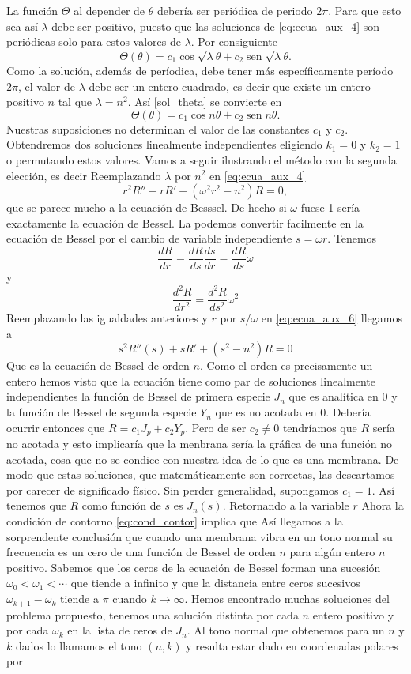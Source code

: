 \documentclass{article}
\newcounter{cor_cont}
\newcounter{lem_cont}
\DeclareMathOperator{\sen}{sen}
\begin{document}
La función $\Theta$ al depender de $\theta$ debería ser periódica de periodo $2\pi$. Para que esto sea así  $\lambda$ debe ser positivo, puesto que las soluciones de  \ref{eq:ecua_aux_4} son periódicas solo para estos valores de $\lambda$. Por consiguiente
\begin{equation}\label{sol_theta}
\Theta(\theta)=c_1\cos\sqrt{\lambda}\theta+c_2\sen\sqrt{\lambda}\theta.
\end{equation}
 Como la solución, además de períodica,  debe tener más específicamente  período $2\pi$, el valor de $\lambda$ debe ser un entero cuadrado, es decir que existe un entero positivo  $n$ tal que $\lambda=n^2$.   Así \eqref{sol_theta} se convierte en 
\[\Theta(\theta)= c_1\cos n\theta+c_2\sen n\theta.\]
Nuestras suposiciones no  determinan el valor de las constantes $c_1$ y $c_2$. Obtendremos dos soluciones linealmente independientes eligiendo $k_1=0$ y $k_2=1$ o permutando estos valores. Vamos a seguir ilustrando el método con la segunda elección, es decir
 Reemplazando $\lambda$ por $n^2$ en \eqref{eq:ecua_aux_4} 
\[r^2R'' +rR'+(\omega^2r^2-n^2) R=0\label{eq:ecua_aux_6},\]
que se parece mucho a la ecuación de Besssel. De hecho si $\omega$ fuese 1 sería exactamente la ecuación de Bessel. La podemos convertir facilmente en la ecuación de Bessel por el cambio de variable independiente $s=\omega r$. Tenemos 
\[\frac{dR}{dr}=\frac{dR}{ds}\frac{ds}{dr}=\frac{dR}{ds}\omega\]
y
\[\frac{d^2R}{dr^2}=\frac{d^2R}{ds^2}\omega^2\]
Reemplazando las igualdades anteriores y $r$ por $s/\omega$ en \eqref{eq:ecua_aux_6} llegamos a
\[s^2R''(s)+sR'+(s^2-n^2)R=0\]
Que es la ecuación de Bessel de orden $n$. Como el orden es precisamente un entero hemos visto que la ecuación tiene como par de soluciones linealmente independientes la función de Bessel de primera especie $J_n$ que es analítica en $0$ y la función de Bessel de segunda especie $Y_n$ que es no acotada en $0$. Debería ocurrir entonces que $R=c_1J_p+c_2Y_p$. Pero de ser $c_2\neq 0$ tendríamos que $R$ sería no acotada y esto implicaría que la menbrana sería la gráfica de una función no acotada, cosa que no se condice con nuestra idea de lo que es una membrana. De modo que estas soluciones, que matemáticamente son correctas, las descartamos por carecer de significado físico. Sin perder generalidad, supongamos $c_1=1$. Así tenemos que $R$ como función de $s$ es $J_n(s)$. Retornando a la variable $r$
Ahora la condición de contorno \eqref{eq:cond_contor} implica que
Así llegamos a la sorprendente conclusión que cuando una membrana vibra en un tono normal su frecuencia es un cero de una función de Bessel de orden $n$ para algún entero $n$ positivo. Sabemos que los ceros de la ecuación de Bessel forman una sucesión $\omega_0<\omega_1<\cdots$ que tiende a infinito y que la distancia entre ceros sucesivos $\omega_{k+1}-\omega_k$ tiende a $\pi$ cuando $k\to\infty$. Hemos encontrado muchas soluciones del problema propuesto, tenemos una solución distinta por cada $n$ entero positivo y por cada $\omega_k$ en la lista de ceros de $J_n$. Al tono normal que obtenemos para un $n$ y $k$ dados lo llamamos el tono $(n,k)$ y resulta estar dado en coordenadas polares por
\end{document}

